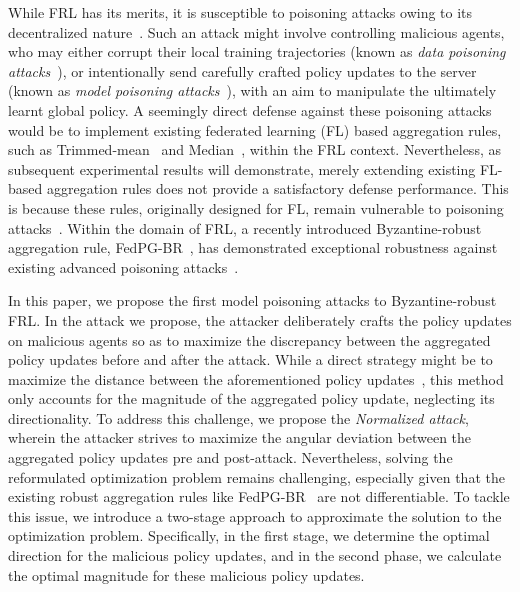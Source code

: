 While FRL has its merits, it is susceptible to poisoning attacks owing to its decentralized nature~\cite{fan2021fault}. 
Such an attack might involve controlling malicious agents, who may either corrupt their local training trajectories (known as \emph{data poisoning attacks}~\cite{fan2021fault}), or intentionally send carefully crafted policy updates to the server (known as \emph{model poisoning attacks}~\cite{fang2020local,shejwalkar2021manipulating,baruch2019little}), with an aim to manipulate the ultimately learnt global policy. A seemingly direct defense against these poisoning attacks would be to implement existing federated learning (FL) based aggregation rules, such as Trimmed-mean~\cite{yin2018byzantine} and Median~\cite{yin2018byzantine}, within the FRL context. Nevertheless, as subsequent experimental results will demonstrate, merely extending existing FL-based aggregation rules does not provide a satisfactory defense performance. 
This is because these rules, originally designed for FL, remain vulnerable to poisoning attacks~\cite{fang2020local,shejwalkar2021manipulating}.
%
Within the domain of FRL, a recently introduced Byzantine-robust aggregation rule, FedPG-BR~\cite{fan2021fault}, has demonstrated exceptional robustness against existing advanced poisoning attacks~\cite{fang2020local,shejwalkar2021manipulating}.







In this paper, we propose the first model poisoning attacks to Byzantine-robust FRL. 
%
In the attack we propose, the attacker deliberately crafts the policy updates on malicious agents so as to maximize the discrepancy between the aggregated policy updates before and after the attack.  
%
While a direct strategy might be to maximize the distance
between the aforementioned policy updates~\cite{shejwalkar2021manipulating}, this method only accounts for the magnitude of the aggregated policy update, neglecting its directionality. To address this challenge, we propose the \emph{Normalized attack}, wherein the attacker strives to maximize the angular deviation between the aggregated policy updates pre and post-attack.
%
Nevertheless, solving the reformulated optimization problem remains challenging, especially given that the existing robust aggregation rules like FedPG-BR~\cite{fan2021fault} are not differentiable. To tackle this issue, we introduce a two-stage approach to approximate the solution to the optimization problem. Specifically, in the first stage, we determine the optimal direction for the malicious policy updates, and in the second phase, we calculate the optimal magnitude for these malicious policy updates.




